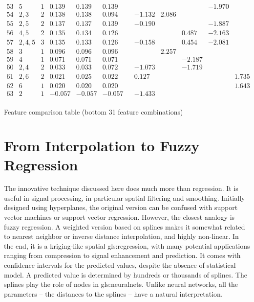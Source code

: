 \documentclass[oneside,10pt]{book}
\newcommand\Chapter[2]{
  \chapter[#1]{#1\\[2ex]\Large\itshape#2}
}
\begin{document}
\begin{table}
\[\begin{array}{lcc|rrr|rrrrrr}
53	&	5	&	1	&	0.139	&	0.139	&	0.139	&		&		&		&		&	-1.970	&		\\
54	&	2,3	&	2	&	0.138	&	0.138	&	0.094	&		&	-1.132	&	2.086	&		&		&		\\
55	&	2,5	&	2	&	0.137	&	0.137	&	0.139	&		&	-0.190	&		&		&	-1.887	&		\\
56	&	4,5	&	2	&	0.135	&	0.134	&	0.126	&		&		&		&	0.487	&	-2.163	&		\\
57	&	2,4,5	&	3	&	0.135	&	0.133	&	0.126	&		&	-0.158	&		&	0.454	&	-2.081	&		\\
58	&	3	&	1	&	0.096	&	0.096	&	0.096	&		&		&	2.257	&		&		&		\\
59	&	4	&	1	&	0.071	&	0.071	&	0.071	&		&		&		&	-2.187	&		&		\\
60	&	2,4	&	2	&	0.033	&	0.033	&	0.072	&		&	-1.073	&		&	-1.719	&		&		\\
61	&	2,6	&	2	&	0.021	&	0.025	&	0.022	&		&	0.127	&		&		&		&	1.735	\\
62	&	6	&	1	&	0.020	&	0.020	&	0.020	&		&		&		&		&		&	1.643	\\
63	&	2	&	1	&	-0.057	&	-0.057	&	-0.057	&		&	-1.433	&		&		&		&		\\

\end{array}
\]
\caption{\label{tabrr01}Feature comparison table (bottom 31 feature combinations)}
\end{table}

\Chapter{From Interpolation to Fuzzy Regression}{}\label{chapterfuzzy}

The innovative technique discussed here does much more than regression. It is useful in signal processing, in particular spatial filtering and smoothing. Initially designed
using hyperplanes, the original version can be confused with support vector machines or support vector regression. However, the closest analogy is fuzzy regression.
A weighted version based on splines makes it somewhat related to nearest neighbor or \textcolor{index}{inverse distance interpolation}, and highly non-linear.  In the end, it is a kriging-like spatial \gls{gls:regression},
with many potential applications ranging from compression to signal enhancement and prediction. It comes with confidence intervals for the predicted values,
despite the absence of statistical model. A predicted value is determined by hundreds or thousands of splines. The splines play the role of nodes
in \glspl{gls:neuralnet}. Unlike neural networks, all the parameters -- the distances to the splines -- have a natural interpretation.
\end{document}
